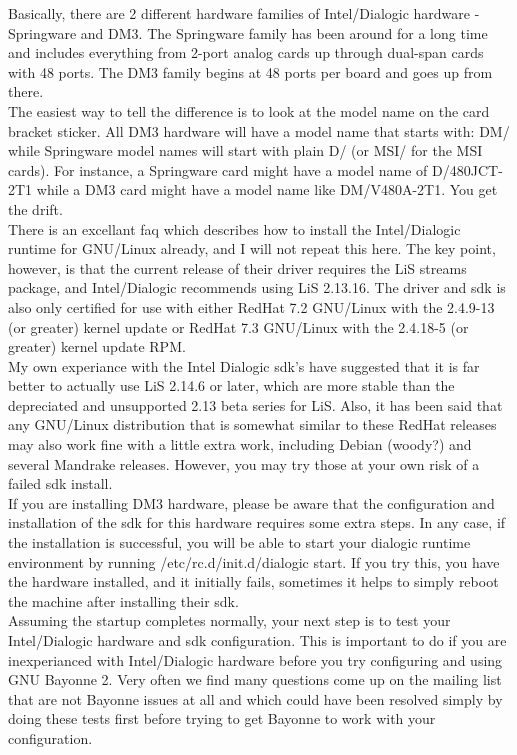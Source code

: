 \documentclass[a4paper,12pt]{article}
\begin{document}
Basically, there are 2 different hardware families of Intel/Dialogic
hardware - Springware and DM3.  The Springware family has been around for
a long time and includes everything from 2-port analog cards up through
dual-span cards with 48 ports.  The DM3 family begins at 48 ports per
board and goes up from there. \\

The easiest way to tell the difference is to look at the model name on the
card bracket sticker. All DM3 hardware will have a model name that starts
with: DM/ while Springware model names will start with plain D/ (or MSI/
for the MSI cards). For instance, a Springware card might have a model
name of D/480JCT-2T1 while a DM3 card might have a model name like
DM/V480A-2T1. You get the drift. \\

There is an excellant faq which describes how to install the
Intel/Dialogic runtime for GNU/Linux already, and I will not repeat this
here.  The key point, however, is that the current release of their driver
requires the LiS streams package, and Intel/Dialogic recommends using LiS
2.13.16.  The driver and sdk is also only certified for use with either
RedHat 7.2 GNU/Linux with the 2.4.9-13 (or greater) kernel update or
RedHat 7.3 GNU/Linux with the 2.4.18-5 (or greater) kernel update RPM. \\

My own experiance with the Intel Dialogic sdk's have suggested that it is
far better to actually use LiS 2.14.6 or later, which are more stable than
the depreciated and unsupported 2.13 beta series for LiS.  Also, it has
been said that any GNU/Linux distribution that is somewhat similar to
these RedHat releases may also work fine with a little extra work,
including Debian (woody?) and several Mandrake releases.  However, you may
try those at your own risk of a failed sdk install. \\

If you are installing DM3 hardware, please be aware that the configuration
and installation of the sdk for this hardware requires some extra steps.
In any case, if the installation is successful, you will be able to start
your dialogic runtime environment by running /etc/rc.d/init.d/dialogic
start.  If you try this, you have the hardware installed, and it initially
fails, sometimes it helps to simply reboot the machine after installing
their sdk. \\

Assuming the startup completes normally, your next step is to test your
Intel/Dialogic hardware and sdk configuration.  This is important to do
if you are inexperianced with Intel/Dialogic hardware before you try
configuring and using GNU Bayonne 2.  Very often we find many questions
come up on the mailing list that are not Bayonne issues at all and which
could have been resolved simply by doing these tests first before trying
to get Bayonne to work with your configuration. \\
\end{document}
